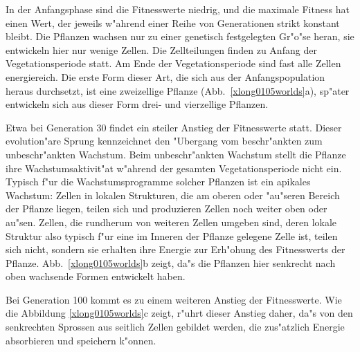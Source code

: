 In der Anfangsphase sind die Fitnesswerte niedrig, und die maximale
Fitness hat einen Wert, der jeweils w"ahrend einer Reihe von Generationen strikt konstant bleibt.
Die Pflanzen wachsen nur zu einer genetisch festgelegten Gr"o"se heran, sie
entwickeln hier nur wenige Zellen. Die Zellteilungen finden zu Anfang der Vegetationsperiode
statt. Am Ende der Vegetationsperiode sind fast alle Zellen energiereich. Die erste Form dieser
Art, die sich aus der Anfangspopulation heraus durchsetzt, ist eine zweizellige Pflanze
(Abb.\ \ref{xlong0105worlds}a), sp"ater entwickeln sich aus dieser Form drei- und vierzellige
Pflanzen.

Etwa bei Generation 30 findet ein steiler Anstieg der Fitnesswerte statt. Dieser evolution"are
Sprung kennzeichnet den "Ubergang vom beschr"ankten zum unbeschr"ankten Wachstum. Beim unbeschr"ankten
Wachstum stellt die Pflanze ihre Wachstumsaktivit"at w"ahrend der gesamten Vegetationsperiode
nicht ein. Typisch f"ur die Wachstumsprogramme solcher Pflanzen ist ein apikales Wachstum: Zellen
in lokalen Strukturen, die am oberen oder "au"seren Bereich der Pflanze liegen, teilen sich
und produzieren Zellen noch weiter oben oder au"sen.
Zellen, die rundherum von weiteren Zellen umgeben sind, deren lokale Struktur also typisch f"ur eine
im Inneren der Pflanze gelegene Zelle ist, teilen sich nicht, sondern sie erhalten ihre Energie
zur Erh"ohung des Fitnesswerts der Pflanze. Abb.\ \ref{xlong0105worlds}b zeigt, da"s die Pflanzen
hier senkrecht nach oben wachsende Formen entwickelt haben.

Bei Generation 100
kommt es zu einem weiteren Anstieg der Fitnesswerte. Wie die Abbildung \ref{xlong0105worlds}c
zeigt, r"uhrt dieser Anstieg daher, da"s von den senkrechten Sprossen aus seitlich Zellen
gebildet werden, die zus"atzlich Energie absorbieren und speichern k"onnen.

